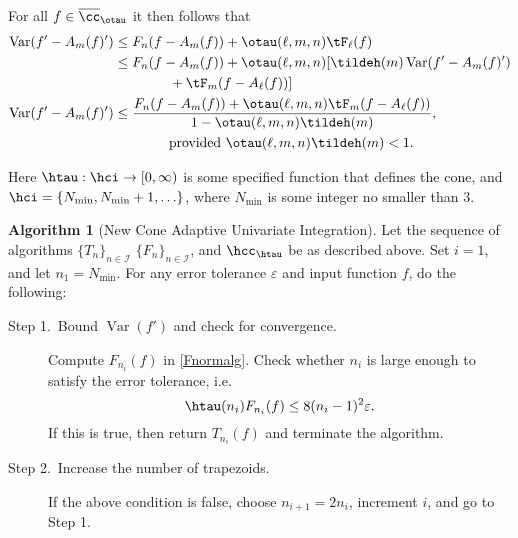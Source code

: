 \documentclass[]{elsarticle}
\DeclareMathOperator{\Var}{Var}
\newcommand{\occ}{\overline{\cc}}
\theoremstyle{definition}
\newtheorem{algo}{Algorithm}
\theoremstyle{remark}
\begin{document}
For all $f \in \occ_{\otau}$ it then follows that
\begin{align*}
\Var(f'-A_m(f)') & \le F_n(f-A_m(f)) + \otau(\ell,m,n) \tF_\ell(f)\\
& \le F_n(f-A_m(f)) + \otau(\ell,m,n) [\tildeh(m)\Var(f'-A_m(f)') \\
&\qquad \qquad + \tF_m(f-A_\ell(f))] \\
\Var(f'-A_m(f)') &\le  \frac{F_n(f-A_m(f)) + \otau(\ell,m,n) \tF_m(f-A_\ell(f))}{1-\otau(\ell,m,n) \tildeh(m)}, \\
&\qquad \qquad \text{provided }\otau(\ell,m,n) \tildeh(m) < 1.
\end{align*}

Here $\htau : \hci \to [0,\infty)$ is some specified function that defines the cone, and $\hci=\{N_{\min}, N_{\min}+1, \ldots \}$, where $N_{\min}$ is some integer no smaller than $3$.  
\begin{algo}[New Cone Adaptive Univariate Integration] \label{newconealgo}
Let the sequence of algorithms $\{T_n\}_{n\in \mathcal{I}}$ $\{F_n\}_{n\in \mathcal{I}}$, and $\hcc_{\htau}$ be as described above.  Set $i=1$, and let $n_1=N_{\min}$. For any error tolerance $\varepsilon$ and input function $f$, do the following:
\begin{description}
\item[Step 1.\ Bound {$\Var(f')$} and check for convergence.] Compute $F_{n_i}(f)$ in \eqref{Fnormalg}.  Check whether $n_i$ is large enough to satisfy the error tolerance, i.e.
    \begin{equation*}
      \htau(n_i) F_{n_i}(f) \le 8 (n_i-1)^2 \varepsilon.
    \end{equation*}
If this is true, then return $T_{n_i}(f)$ and terminate the algorithm.   

\item[Step 2.\ Increase the number of trapezoids.]  If the above condition is false, choose $n_{i+1}=2n_i$, increment $i$, and go to Step 1.
\end{description}
\end{algo}
\end{document}

